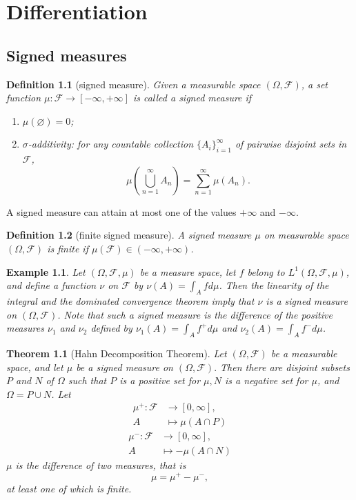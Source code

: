 \documentclass{report}
\newtheorem{definition}{Definition}[section]
\newtheorem{example}{Example}[section]
\newtheorem{theorem}{Theorem}[section]
\theoremstyle{nonumberplain}
\begin{document}
\chapter{Differentiation}

\section{Signed measures}

\begin{definition}[signed measure]
	Given a measurable space $(\Omega, \mathcal{F})$, a set function $\mu:\mathcal{F}\to[-\infty,+\infty]$ is called a \emph{signed measure} if
	\begin{enumerate}
		\item[(a)]$\mu(\varnothing) = 0$;
		\item[(b)]$\sigma$-additivity: for any countable collection $\{A_{i}\}_{i=1}^{\infty }$ of pairwise disjoint sets in $\mathcal{F}$,
		\[
		\mu\left(\bigcup_{n=1}^\infty A_n\right)=\sum_{n=1}^{\infty}\mu(A_n).
		\]
	\end{enumerate}
\end{definition}

A signed measure can attain at most one of the values $+\infty$ and $-\infty$.

\begin{definition}[finite signed measure]
	A signed measure $\mu$ on measurable space $(\Omega, \mathcal{F})$ is \emph{finite} if $\mu(\mathcal{F})\in(-\infty,+\infty)$.
\end{definition}

\begin{example}
	Let $(\Omega, \mathcal{F}, \mu)$ be a measure space, let $f$ belong to $L^{1}(\Omega, \mathcal{F},\mu)$, and define a function $\nu$ on $\mathcal{F}$ by $\nu(A)=\int_{A} f d \mu$. Then the linearity of the integral and the dominated convergence theorem imply that $\nu$ is a signed measure on $(\Omega, \mathcal{F})$. Note that such a signed measure is the difference of the positive measures $\nu_{1}$ and $\nu_{2}$ defined by $\nu_{1}(A)=\int_{A} f^{+} d \mu$ and $\nu_{2}(A)=\int_{A} f^{-} d \mu$.
\end{example}

\begin{theorem}[Hahn Decomposition Theorem]
	Let $(\Omega, \mathcal{F})$ be a measurable space, and let $\mu$ be a signed measure on $(\Omega, \mathcal{F}) .$ Then there are disjoint subsets $P$ and $N$ of $\Omega$ such that $P$ is a positive set for $\mu, N$ is a negative set for $\mu$, and $\Omega=P \cup N$. Let
	\begin{align*}
		\mu^+:\mathcal{F}&\longrightarrow [0,\infty],\\
		A &\longmapsto\mu(A\cap P)
	\end{align*}
	\begin{align*}
		\mu^-:\mathcal{F}&\longrightarrow [0,\infty],\\
		A &\longmapsto-\mu(A\cap N)
	\end{align*}
	$\mu$ is the difference of two measures, that is
	\[
	\mu=\mu^+-\mu^-,
	\]
	at least one of which is finite.
\end{theorem} 
\end{document}
